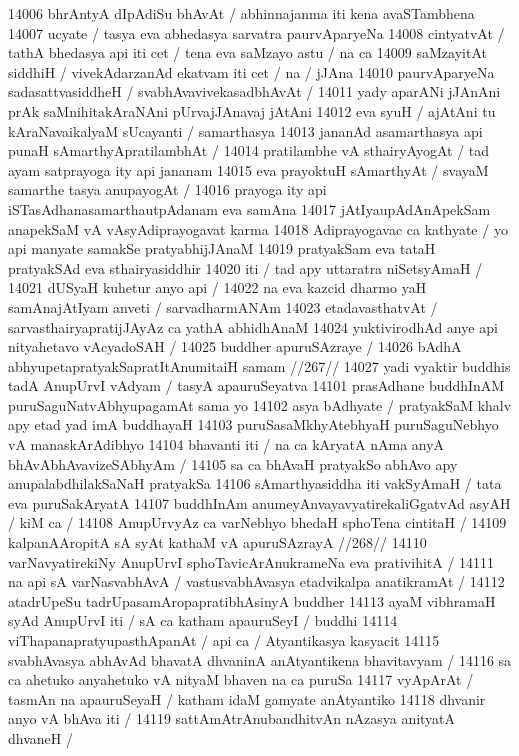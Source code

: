 14006 bhrAntyA dIpAdiSu bhAvAt / abhinnajanma iti kena avaSTambhena 
14007 ucyate / tasya eva abhedasya sarvatra paurvAparyeNa 
14008 cintyatvAt / tathA bhedasya api iti cet / tena eva saMzayo astu / na ca 
14009 saMzayitAt siddhiH / vivekAdarzanAd ekatvam iti cet / na / jJAna 
14010 paurvAparyeNa sadasattvasiddheH / svabhAvavivekasadbhAvAt /  
14011 yady aparANi jJAnAni prAk saMnihitakAraNAni pUrvajJAnavaj jAtAni
14012 eva syuH / ajAtAni tu kAraNavaikalyaM sUcayanti / samarthasya  
14013 jananAd asamarthasya api punaH sAmarthyApratilambhAt /
14014 pratilambhe vA sthairyAyogAt / tad ayam satprayoga ity api jananam
14015 eva prayoktuH sAmarthyAt / svayaM samarthe tasya anupayogAt / 
14016 prayoga ity api iSTasAdhanasamarthautpAdanam eva samAna
14017 jAtIyaupAdAnApekSam anapekSaM vA vAsyAdiprayogavat karma
14018 Adiprayogavac ca kathyate / yo api manyate samakSe pratyabhijJAnaM 
14019 pratyakSam eva tataH pratyakSAd eva sthairyasiddhir
14020 iti / tad apy uttaratra niSetsyAmaH /
14021 	dUSyaH kuhetur anyo api / 
14022 na eva kazcid dharmo yaH samAnajAtIyam anveti / sarvadharmANAm  
14023 etadavasthatvAt / sarvasthairyapratijJAyAz ca yathA abhidhAnaM
14024 yuktivirodhAd anye api nityahetavo vAcyadoSAH /
14025 	buddher apuruSAzraye /  
14026 	bAdhA abhyupetapratyakSapratItAnumitaiH samam //267//
14027 yadi vyaktir buddhis tadA AnupUrvI vAdyam / tasyA apauruSeyatva 
14101 prasAdhane buddhInAM puruSaguNatvAbhyupagamAt sama yo  
14102 asya bAdhyate / pratyakSaM khalv apy etad yad imA buddhayaH 
14103 puruSasaMkhyAtebhyaH puruSaguNebhyo vA manaskArAdibhyo
14104 bhavanti iti / na ca kAryatA nAma anyA bhAvAbhAvavizeSAbhyAm / 
14105 sa ca bhAvaH pratyakSo abhAvo apy anupalabdhilakSaNaH pratyakSa 
14106 sAmarthyasiddha iti vakSyAmaH / tata eva puruSakAryatA  
14107 buddhInAm anumeyAnvayavyatirekaliGgatvAd asyAH / kiM ca /
14108 	AnupUrvyAz ca varNebhyo bhedaH sphoTena cintitaH / 
14109 	kalpanAAropitA sA syAt kathaM vA apuruSAzrayA //268//  
14110 varNavyatirekiNy AnupUrvI sphoTavicArAnukrameNa eva prativihitA /
14111 na api sA varNasvabhAvA / vastusvabhAvasya etadvikalpa anatikramAt /
14112 atadrUpeSu tadrUpasamAropapratibhAsinyA buddher
14113 ayaM vibhramaH syAd AnupUrvI iti / sA ca katham apauruSeyI / buddhi
14114 viThapanapratyupasthApanAt / api ca / Atyantikasya kasyacit  
14115 svabhAvasya abhAvAd bhavatA dhvaninA anAtyantikena bhavitavyam / 
14116 sa ca ahetuko anyahetuko vA nityaM bhaven na ca puruSa  
14117 vyApArAt / tasmAn na apauruSeyaH / katham idaM gamyate anAtyantiko
14118 dhvanir anyo vA bhAva iti /
14119 	sattAmAtrAnubandhitvAn nAzasya anityatA dhvaneH /
